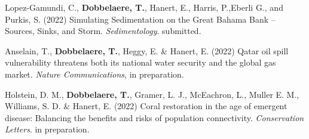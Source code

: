 \begin{list}{}{%
    \setlength{\topsep}{0pt}%
    \setlength{\leftmargin}{0.23in}%
    \setlength{\listparindent}{-0.23in}%
    \setlength{\itemindent}{-0.23in}%
    \setlength{\parsep}{\parskip}%
    }
    \item Lopez-Gamundi, C., \textbf{Dobbelaere, T.}, Hanert, E., Harris, P.,Eberli G., and Purkis, S. (2022) Simulating Sedimentation on the Great Bahama Bank – Sources, Sinks, and Storm. \textit{Sedimentology}. submitted.
    
    \item Anselain, T., \textbf{Dobbelaere, T.}, Heggy, E. \& Hanert, E. (2022) Qatar oil spill vulnerability threatens both its national water security and the global gas market. \textit{Nature Communications}, in preparation.
    
    \item Holstein, D. M., \textbf{Dobbelaere, T.}, Gramer, L. J., McEachron, L., Muller E. M., Williams, S. D. \& Hanert, E. (2022) Coral restoration in the age of emergent disease: Balancing the benefits and risks of population connectivity. \textit{Conservation Letters}. in preparation. 
    
\end{list}